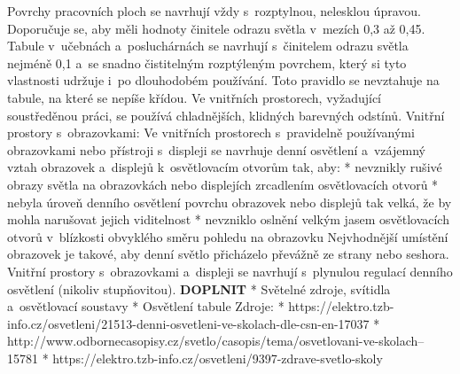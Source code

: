 Povrchy pracovních ploch se navrhují vždy s~rozptylnou, nelesklou úpravou. Doporučuje se, aby měli hodnoty
činitele odrazu světla v~mezích 0,3 až 0,45.
\medskip
Tabule v~učebnách a~posluchárnách se navrhují s~činitelem odrazu světla nejméně 0,1 a~se snadno čistitelným
rozptýleným povrchem, který si tyto vlastnosti udržuje i~po dlouhodobém používání.
Toto pravidlo se nevztahuje na tabule, na které se nepíše křídou.
\medskip
Ve vnitřních prostorech, vyžadující soustředěnou práci, se používá chladnějších, klidných barevných odstínů.
\medskip
Vnitřní prostory s~obrazovkami:
\medskip
Ve vnitřních prostorech s~pravidelně používanými obrazovkami nebo přístroji s~displeji se navrhuje denní
osvětlení a~vzájemný vztah obrazovek a~displejů k~osvětlovacím otvorům tak, aby:
\medskip
\begitems
    * nevznikly rušivé obrazy světla na obrazovkách nebo displejích zrcadlením osvětlovacích otvorů
    * nebyla úroveň denního osvětlení povrchu obrazovek nebo displejů tak velká, že by mohla narušovat jejich viditelnost
    * nevzniklo oslnění velkým jasem osvětlovacích otvorů v~blízkosti obvyklého směru pohledu na obrazovku
\enditems
\medskip
Nejvhodnější umístění obrazovek je takové, aby denní světlo přicházelo převážně ze strany nebo seshora.
\medskip
Vnitřní prostory s~obrazovkami a~displeji se navrhují s~plynulou regulací denního osvětlení (nikoliv stupňovitou).
\medskip
{\bf DOPLNIT}
\begitems
* Světelné zdroje, svítidla a~osvětlovací soustavy
* Osvětlení tabule
\enditems
\medskip
{\sbf Zdroje:}
\begitems
* https://elektro.tzb-info.cz/osvetleni/21513-denni-osvetleni-ve-skolach-dle-csn-en-17037
* http://www.odbornecasopisy.cz/svetlo/casopis/tema/osvetlovani-ve-skolach--15781
* https://elektro.tzb-info.cz/osvetleni/9397-zdrave-svetlo-skoly
\enditems





